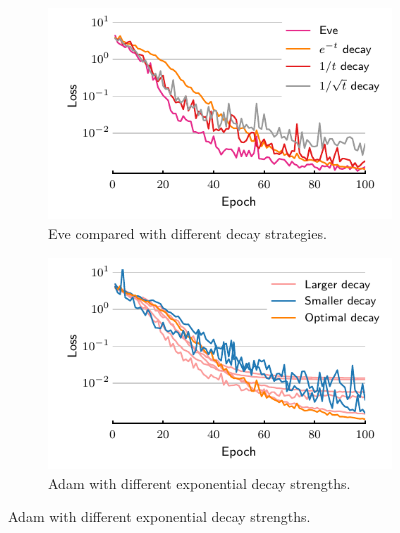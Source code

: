 \documentclass[preview,varwidth=7in,border=0mm]{standalone}
\begin{document}
\begin{figure}
    \centering
    \hfill%
    \begin{subfigure}[t]{0.5\textwidth}
        \centering
        \includegraphics[width=\linewidth]{bests.pdf}
        \caption{Eve compared with different decay strategies.}
    \end{subfigure}%
    \begin{subfigure}[t]{0.5\textwidth}
        \centering
        \includegraphics[width=\linewidth]{exps.pdf}
        \caption{Adam with different exponential decay strengths.}
    \end{subfigure}
    \hfill%
\end{figure}
\end{document}
